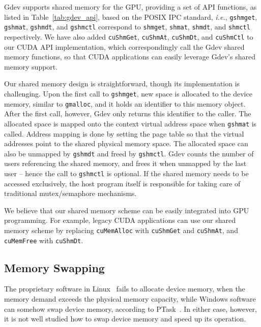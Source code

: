 Gdev supports shared memory for the GPU, providing a set of API
functions, as listed in Table~\ref{tab:gdev_api}, based on the POSIX IPC
standard, \textit{i.e.}, \texttt{gshmget}, \texttt{gshmat},
\texttt{gshmdt}, and \texttt{gshmctl} correspond to \texttt{shmget},
\texttt{shmat}, \texttt{shmdt}, and \texttt{shmctl} respectively.
We have also added \texttt{cuShmGet}, \texttt{cuShmAt},
\texttt{cuShmDt}, and \texttt{cuShmCtl} to our CUDA API 
implementation, which correspondingly call the Gdev shared memory
functions, so that CUDA applications can easily leverage Gdev's shared
memory support.

Our shared memory design is straightforward, though its implementation
is challenging.
Upon the first call to \texttt{gshmget}, new space is allocated to the
device memory, similar to \texttt{gmalloc}, and it holds an identifier
to this memory object. 
After the first call, however, Gdev only returns this identifier to the
caller.
The allocated space is mapped onto the context virtual address space
when \texttt{gshmat} is called.
Address mapping is done by setting the page table so that the virtual
addresses point to the shared physical memory space.
The allocated space can also be unmapped by \texttt{gshmdt} and freed by
\texttt{gshmctl}. 
Gdev counts the number of users referencing the shared memory, and frees
it when unmapped by the last user -- hence the call to \texttt{gshmctl}
is optional.
If the shared memory needs to be accessed exclusively, the host
program itself is responsible for taking care of traditional
mutex/semaphore mechanisms.

We believe that our shared memory scheme can be easily integrated into
GPU programming.
For example, legacy CUDA applications can use our shared memory scheme
by replacing \texttt{cuMemAlloc} with \texttt{cuShmGet} and
\texttt{cuShmAt}, and \texttt{cuMemFree} with \texttt{cuShmDt}.

\vspace{-0.25em}
\subsection{Memory Swapping}
\label{sec:memory_swapping}
\vspace{-0.25em}

The proprietary software in Linux~\cite{CUDA40} fails to allocate
device memory, when the memory demand exceeds the physical memory
capacity, while Windows software can somehow swap device memory,
according to PTask~\cite{Rossbach_SOSP11}. 
In either case, however, it is not well studied how to swap device
memory and speed up its operation.

